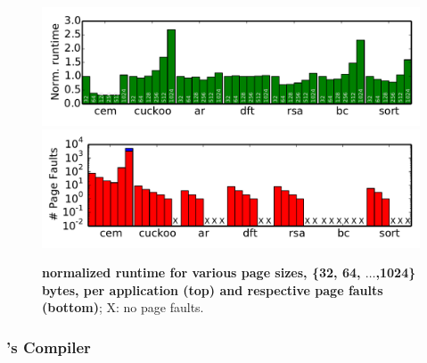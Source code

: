 \begin{figure}
	\centering
	\includegraphics[width=\columnwidth]{figures/ramPagsSizes}
	\includegraphics[width=\columnwidth]{figures/pagefault}
	\caption{\textbf{\sys normalized runtime for various page sizes, \{32, 64, $\ldots$,1024\}\,bytes, per application (top) and respective page faults (bottom)}; X: no page faults.}
	\label{fig:page_size}
\end{figure}

\subsubsection{\sys's Compiler}
\label{sec:result_compiler_time}

